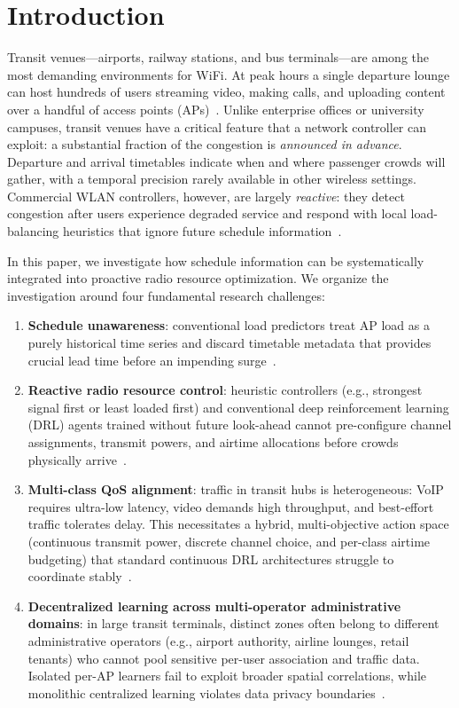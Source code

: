 \section{Introduction}
\label{sec:intro}

Transit venues---airports, railway stations, and bus terminals---are among the most demanding environments for WiFi. At peak hours a single departure lounge can host hundreds of users streaming video, making calls, and uploading content over a handful of access points (APs)~\cite{kougioumtzidis2025}. Unlike enterprise offices or university campuses, transit venues have a critical feature that a network controller can exploit: a substantial fraction of the congestion is \emph{announced in advance}. Departure and arrival timetables indicate when and where passenger crowds will gather, with a temporal precision rarely available in other wireless settings. Commercial WLAN controllers, however, are largely \emph{reactive}: they detect congestion after users experience degraded service and respond with local load-balancing heuristics that ignore future schedule information~\cite{du2024}.

In this paper, we investigate how schedule information can be systematically integrated into proactive radio resource optimization. We organize the investigation around four fundamental research challenges:

\begin{enumerate}
  \item \textbf{Schedule unawareness}: conventional load predictors treat AP load as a purely historical time series and discard timetable metadata that provides crucial lead time before an impending surge~\cite{pang2024}.
  \item \textbf{Reactive radio resource control}: heuristic controllers (e.g., strongest signal first or least loaded first) and conventional deep reinforcement learning (DRL) agents trained without future look-ahead cannot pre-configure channel assignments, transmit powers, and airtime allocations before crowds physically arrive~\cite{alauthman2025}.
  \item \textbf{Multi-class QoS alignment}: traffic in transit hubs is heterogeneous: VoIP requires ultra-low latency, video demands high throughput, and best-effort traffic tolerates delay. This necessitates a hybrid, multi-objective action space (continuous transmit power, discrete channel choice, and per-class airtime budgeting) that standard continuous DRL architectures struggle to coordinate stably~\cite{yu2026}.
  \item \textbf{Decentralized learning across multi-operator administrative domains}: in large transit terminals, distinct zones often belong to different administrative operators (e.g., airport authority, airline lounges, retail tenants) who cannot pool sensitive per-user association and traffic data. Isolated per-AP learners fail to exploit broader spatial correlations, while monolithic centralized learning violates data privacy boundaries~\cite{du2024}.
\end{enumerate}

